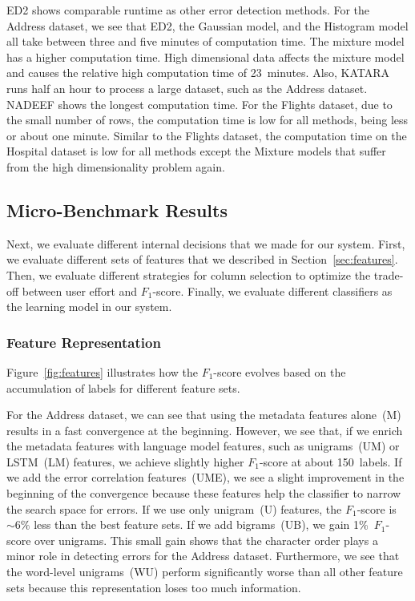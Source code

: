 ED2 shows comparable runtime as other error detection methods.
For the Address dataset, we see that ED2, the Gaussian model, and the Histogram model all take between three and five minutes of computation time. The mixture model has a higher computation time. High dimensional data affects the mixture model and causes the relative high computation time of 23~minutes. Also, KATARA runs half an hour to process a large dataset, such as the Address dataset.
NADEEF shows the longest computation time. 
For the Flights dataset, due to the small number of rows, the computation time is low for all methods, being less or about one minute. 
Similar to the Flights dataset, the computation time on the Hospital dataset is low for all methods except the Mixture models that suffer from the high dimensionality problem again. 



\subsection{Micro-Benchmark Results}
\label{sec:microbenchmark}

Next, we evaluate different internal decisions that we made for our system.
First, we evaluate different sets of features that we described in Section~\ref{sec:features}. Then, we evaluate different strategies for column selection to optimize the trade-off between user effort and $F_1$-score. Finally, we evaluate different classifiers as the learning model in our system. 

\subsubsection{Feature Representation}
\label{sec:feature_selection_experiment}

Figure~\ref{fig:features} illustrates how the $F_1$-score evolves based on the accumulation of labels for different feature sets.

For the Address dataset, we can see that using the metadata features alone~(M) results in a fast convergence at the beginning. However, we see that, if we enrich the metadata features with language model features, such as unigrams~(UM) or LSTM~(LM) features, we achieve slightly higher $F_1$-score at about 150~labels. If we add the error correlation features~(UME), we see a slight improvement in the beginning of the convergence because these features help the classifier to narrow the search space for errors.
If we use only unigram~(U) features, the $F_1$-score is ${\sim}6\%$ less than the best feature sets. If we add bigrams~(UB), we gain 1\%~$F_1$-score over unigrams. This small gain shows that the character order plays a minor role in detecting errors for the Address dataset.
Furthermore, we see that the word-level unigrams~(WU) perform significantly worse than all other feature sets because this representation loses too much information. 

